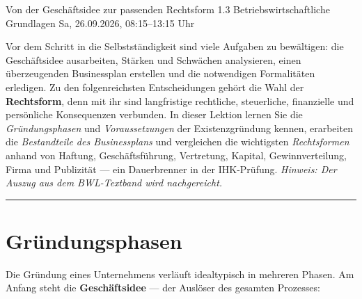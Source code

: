 \documentclass[11pt, a4paper]{article}
\begin{document}
%
  {Von der Geschäftsidee zur passenden Rechtsform}%
  {1.3 Betriebswirtschaftliche Grundlagen}%
  {Sa, 26.09.2026, 08:15--13:15 Uhr}

\begin{merksatz}[title={\bfseries Worum geht es in dieser Lektion?}]
Vor dem Schritt in die Selbstständigkeit sind viele Aufgaben zu bewältigen: die
Geschäftsidee ausarbeiten, Stärken und Schwächen analysieren, einen überzeugenden
Businessplan erstellen und die notwendigen Formalitäten erledigen. Zu den folgenreichsten
Entscheidungen gehört die Wahl der \textbf{Rechtsform}, denn mit ihr sind langfristige
rechtliche, steuerliche, finanzielle und persönliche Konsequenzen verbunden. In dieser
Lektion lernen Sie die \emph{Gründungsphasen} und \emph{Voraussetzungen} der
Existenzgründung kennen, erarbeiten die \emph{Bestandteile des Businessplans} und
vergleichen die wichtigsten \emph{Rechtsformen} anhand von Haftung, Geschäftsführung,
Vertretung, Kapital, Gewinnverteilung, Firma und Publizität --- ein Dauerbrenner in der
IHK-Prüfung. \emph{Hinweis: Der Auszug aus dem BWL-Textband wird nachgereicht.}
\end{merksatz}

\tableofcontents
\vspace{1em}
\hrule
\vspace{1em}

\section{Gründungsphasen}

Die Gründung eines Unternehmens verläuft idealtypisch in mehreren Phasen. Am Anfang steht
die \textbf{Geschäftsidee} --- der Auslöser des gesamten Prozesses:
\end{document}
